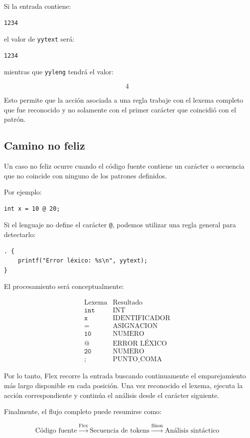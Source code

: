 \documentclass{article}
\begin{document}
Si la entrada contiene:

\begin{verbatim}
1234
\end{verbatim}

el valor de \texttt{yytext} será:

\begin{verbatim}
1234
\end{verbatim}

mientras que \texttt{yyleng} tendrá el valor:

\[
4
\]

Esto permite que la acción asociada a una regla trabaje con el lexema
completo que fue reconocido y no solamente con el primer carácter que
coincidió con el patrón.

\subsection{Camino no feliz}

Un caso no feliz ocurre cuando el código fuente contiene un carácter o
secuencia que no coincide con ninguno de los patrones definidos.

Por ejemplo:

\begin{verbatim}
int x = 10 @ 20;
\end{verbatim}

Si el lenguaje no define el carácter \texttt{@}, podemos utilizar una
regla general para detectarlo:

\begin{verbatim}
. {
    printf("Error léxico: %s\n", yytext);
}
\end{verbatim}

El procesamiento será conceptualmente:

\[
\begin{array}{c|c}
\text{Lexema} & \text{Resultado} \\
\hline
\texttt{int} & \text{INT} \\
\texttt{x} & \text{IDENTIFICADOR} \\
\texttt{=} & \text{ASIGNACION} \\
\texttt{10} & \text{NUMERO} \\
\texttt{@} & \text{ERROR LÉXICO} \\
\texttt{20} & \text{NUMERO} \\
\texttt{;} & \text{PUNTO\_COMA}
\end{array}
\]

Por lo tanto, Flex recorre la entrada buscando continuamente el
emparejamiento más largo disponible en cada posición. Una vez reconocido
el lexema, ejecuta la acción correspondiente y continúa el análisis desde
el carácter siguiente.

Finalmente, el flujo completo puede resumirse como:

\[
\text{Código fuente}
\xrightarrow{\text{Flex}}
\text{Secuencia de tokens}
\xrightarrow{\text{Bison}}
\text{Análisis sintáctico}
\]
\end{document}
